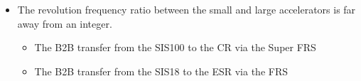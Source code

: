 \begin{itemize}

 	\item The revolution frequency ratio between the small and large accelerators is far away from an integer.
		\begin{itemize}
			\item The B2B transfer from the SIS100 to the CR via the Super FRS
			\item The B2B transfer from the SIS18 to the ESR via the FRS
		\end{itemize}
\end{itemize}
  

